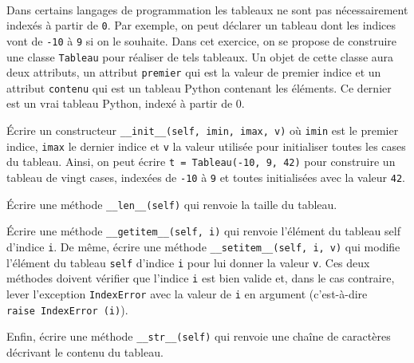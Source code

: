 \documentclass[a4paper,17pt]{extarticle}
\newenvironment{eleve}%
{\begin{activite}\color{noiramu}\\[-0.5cm]}
{\end{activite}}
\begin{document}
\begin{eleve}
    Dans certains langages de programmation les tableaux ne sont pas
nécessairement indexés à partir de \texttt{0}. Par exemple, on peut
déclarer un tableau dont les indices vont de \texttt{-10} à \texttt{9}
si on le souhaite. Dans cet exercice, on se propose de construire une
classe \texttt{Tableau} pour réaliser de tels tableaux. Un objet de
cette classe aura deux attributs, un attribut \texttt{premier} qui est
la valeur de premier indice et un attribut \texttt{contenu} qui est un
tableau Python contenant les éléments. Ce dernier est un vrai tableau
Python, indexé à partir de 0.

Écrire un constructeur \texttt{\_\_init\_\_(self,\ imin,\ imax,\ v)} où
\texttt{imin} est le premier indice, \texttt{imax} le dernier indice et
\texttt{v} la valeur utilisée pour initialiser toutes les cases du
tableau. Ainsi, on peut écrire \texttt{t\ =\ Tableau(-10,\ 9,\ 42)} pour
construire un tableau de vingt cases, indexées de \texttt{-10} à
\texttt{9} et toutes initialisées avec la valeur \texttt{42}.

Écrire une méthode \texttt{\_\_len\_\_(self)} qui renvoie la taille du
tableau.

Écrire une méthode \texttt{\_\_getitem\_\_(self,\ i)} qui renvoie
l'élément du tableau self d'indice \texttt{i}. De même, écrire une
méthode \texttt{\_\_setitem\_\_(self,\ i,\ v)} qui modifie l'élément du
tableau \texttt{self} d'indice \texttt{i} pour lui donner la valeur
\texttt{v}. Ces deux méthodes doivent vérifier que l'indice \texttt{i}
est bien valide et, dans le cas contraire, lever l'exception
\texttt{IndexError} avec la valeur de \texttt{i} en argument
(c'est-à-dire \texttt{raise\ IndexError\ (i)}).

Enfin, écrire une méthode \texttt{\_\_str\_\_(self)} qui renvoie une
chaîne de caractères décrivant le contenu du tableau.
        
        \end{eleve}
\end{document}
